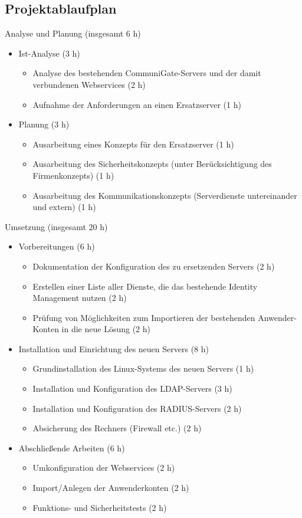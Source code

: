 \documentclass[11pt,a4paper,titlepage=firstiscover,headsepline,bibtotoc]{scrartcl} %
\begin{document}
\subsection{Projektablaufplan}
Analyse und Planung (insgesamt 6 h)
	\begin{itemize}
	\item Ist-Analyse (3 h)
		\begin{itemize}
		\item Analyse des bestehenden CommuniGate-Servers und der damit verbundenen Webservices (2 h)
		\item Aufnahme der Anforderungen an einen Ersatzserver (1 h)
		\end{itemize}
	\item Planung (3 h)
		\begin{itemize}
		\item Ausarbeitung eines Konzepts für den Ersatzserver (1 h)
		\item Ausarbeitung des Sicherheitskonzepts (unter Berücksichtigung des Firmenkonzepts) (1 h)
		\item Ausarbeitung des Kommunikationskonzepts (Serverdienste untereinander und extern) (1 h)
		\end{itemize}
	\end{itemize}
Umsetzung (insgesamt 20 h)
	\begin{itemize}
	\item Vorbereitungen (6 h)
		\begin{itemize}
		\item Dokumentation der Konfiguration des zu ersetzenden Servers (2 h)
		\item Erstellen einer Liste aller Dienste, die das bestehende Identity Management nutzen (2 h)
		\item Prüfung von Möglichkeiten zum Importieren der bestehenden Anwender-Konten in die neue Lösung (2 h)
		\end{itemize}
	\item Installation und Einrichtung des neuen Servers (8 h)
		\begin{itemize}
		\item Grundinstallation des Linux-Systems des neuen Servers (1 h)
		\item Installation und Konfiguration des LDAP-Servers (3 h)
		\item Installation und Konfiguration des RADIUS-Servers (2 h)
		\item Absicherung des Rechners (Firewall etc.) (2 h)
		\end{itemize}
	\item Abschließende Arbeiten (6 h)
		\begin{itemize}
		\item Umkonfiguration der Webservices (2 h)
		\item Import/Anlegen der Anwenderkonten (2 h)
		\item Funktions- und Sicherheitstests (2 h)
		\end{itemize}
	\end{itemize}
\end{document}
